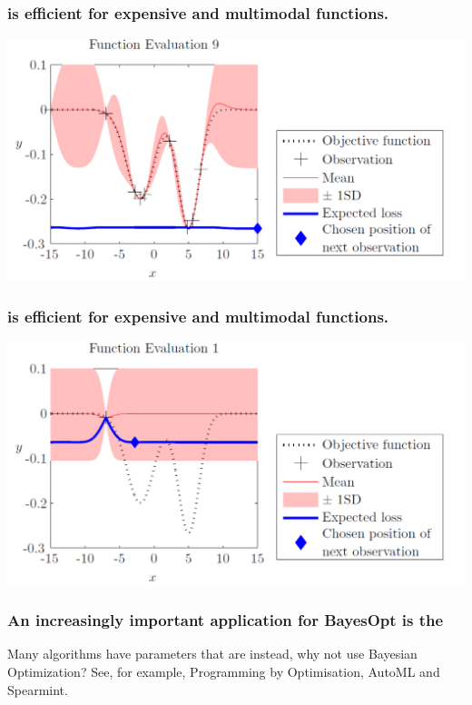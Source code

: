 \documentclass[12pt,onlymath]{beamer}
\begin{document}
\begin{frame}\frametitle{ is efficient for expensive and multimodal functions.}
\includegraphics[width = \textwidth]{./figures/bo9.pdf}
\end{frame}
\begin{frame}\frametitle{ is efficient for expensive and multimodal functions.}
\includegraphics[width = \textwidth]{./figures/bo1.pdf}
\end{frame}

\begin{frame}\frametitle{An increasingly important application for BayesOpt is the }

Many algorithms have parameters that are  instead, why not use Bayesian Optimization?
\vfill
See, for example,
{Programming by Optimisation,}
{AutoML} and
{Spearmint.}

\end{frame}
\end{document}
